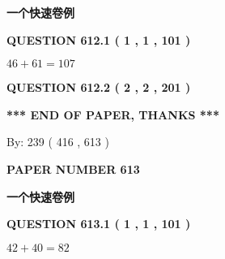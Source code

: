 \documentclass{ctexart}
\begin{document}
   
   
   
 \vspace{0.2in}
{\LARGE {\textbf{ 一个快速卷例}}}
   
   
  
\vspace{0.2in}
  
{\textbf{\Large{QUESTION
612.1 
 ( 1 , 1 , 101 )
}}}
  
  
 
 

$ %
46 +  %
61=   %
107$
 
 
  
\vspace{0.2in}
  
{\textbf{\Large{QUESTION
612.2 
 ( 2 , 2 , 201 )
}}}
  
  
   
   
 \vspace{0.2in}
 
   
   
   
   
\vspace{1.0in} 
{\textbf{\large{ *** END OF PAPER, THANKS *** }}} 
   
   
\hspace{1.0in} By: 
 239 ( 416 ,  613 )
   
   
   
   
\newpage 
\setcounter{page}{ 
   613001 } 
   
   
   
   
 {\textbf{ \Large{ PAPER NUMBER  613  }}}
   
   
\vspace{0.2in}
   
   
   
   
   
   
 \vspace{0.2in}
{\LARGE {\textbf{ 一个快速卷例}}}
   
   
  
\vspace{0.2in}
  
{\textbf{\Large{QUESTION
613.1 
 ( 1 , 1 , 101 )
}}}
  
  
 
 

$ %
42 +  %
40=   %
82$
 
 
  
\vspace{0.2in}
  
\end{document}
